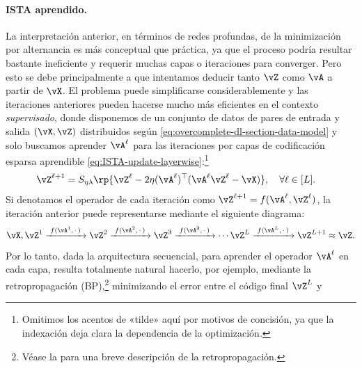 \documentclass[../../book-main.tex]{subfiles}
\begin{document}
\paragraph{ISTA aprendido.} La interpretación anterior, en términos de redes profundas, de la
minimización por alternancia es más conceptual que práctica, ya que el proceso podría
resultar bastante ineficiente y requerir muchas capas o iteraciones para converger.
Pero esto se debe principalmente a que intentamos deducir tanto \(\vZ\) como \(\vA\) 
a partir de \(\vX\). El problema puede simplificarse considerablemente y las iteraciones 
anteriores pueden hacerse mucho más eficientes en el contexto \textit{supervisado}, donde
disponemos de un conjunto de datos de pares de entrada y salida \((\vX, \vZ)\) distribuidos 
según \eqref{eq:overcomplete-dl-section-data-model} y solo buscamos aprender
\(\vA^\ell\) para las iteraciones por capas de codificación esparsa aprendible 
\eqref{eq:ISTA-update-layerwise}:\footnote{Omitimos los acentos de «tilde»
    aquí por motivos de concisión, ya que la indexación deja
clara la dependencia de la optimización.}
\begin{align}
    & \vZ^{\ell + 1} = S_{\eta\lambda}\rp{\vZ^{\ell} -
    2\eta(\vA^{\ell})^{\top}(\vA^\ell\vZ^{\ell} - \vX)}, \quad
    \forall \ell \in [L].
\end{align}
Si denotamos el operador de cada iteración como $\vZ^{\ell + 1} =
f(\vA^\ell, \vZ^\ell)$, la iteración anterior puede representarse
mediante el siguiente diagrama:
\begin{equation*}
    \vX, \vZ^1 \xrightarrow{\hspace{1mm} f(\vA^1,\,\cdot\,)
    \hspace{1mm}}  \vZ^2 \xrightarrow{\hspace{1mm}
    f(\vA^2,\,\cdot\,) \hspace{1mm}}  \vZ^3
    \xrightarrow{\hspace{1mm} f(\vA^3,\,\cdot\,) \hspace{1mm}}
    \cdots \vZ^{L}  \xrightarrow{\hspace{1mm}
    f(\vA^{L},\,\cdot\,) \hspace{1mm}} \vZ^{L + 1} \approx \vZ.
    \label{eqn:deep-sparse-encoding}
\end{equation*}
Por lo tanto, dada la arquitectura secuencial, para aprender el operador
\(\vA^\ell\) en cada capa, resulta totalmente natural hacerlo, por ejemplo, 
mediante la retropropagación (BP),\footnote{Véase la  para 
    una breve descripción de
la retropropagación.} minimizando el error entre el código final $\vZ^L$ y
\end{document}
